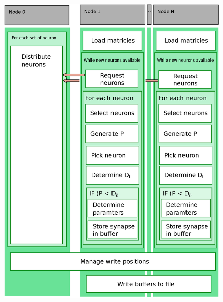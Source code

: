 \begin{figure}[ht!]
\centering
\includegraphics[scale=0.5]{pictures/shortRange_parallelAlg.eps}
\end{figure}

